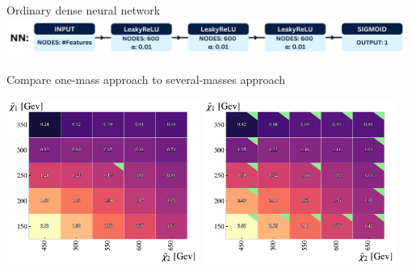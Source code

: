 \documentclass[UKenglish]{beamer}
\begin{document}
\begin{frame}{Ordinary dense neural network}
    \vfill
    \centering
    \includegraphics[width = 0.98\textwidth]{figures/NN.png}
\end{frame}
\begin{frame}{Compare one-mass approach to several-masses approach}
    \vfill
    \begin{center}
        \includegraphics[width = 0.475\textwidth]{figures/grids/NN_OneMass_InterpolationGridSig.pdf}
        \includegraphics[width = 0.475\textwidth]{figures/grids/NN_InterpolationGridSig.pdf}
    \end{center}
\end{frame}
\end{document}
